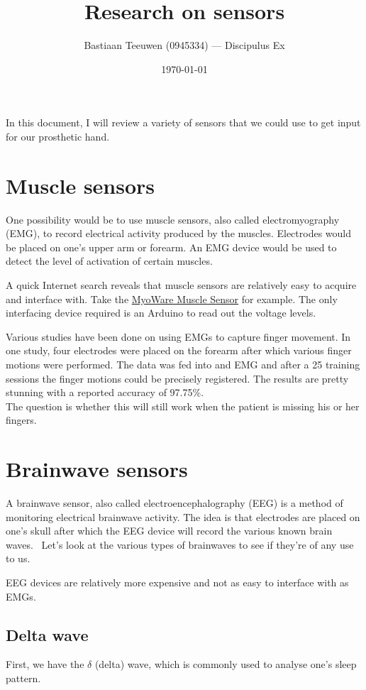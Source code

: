 \documentclass[11pt,a4paper]{article}
\title{Research on sensors}
\author{Bastiaan Teeuwen (0945334) --- Discipulus Ex}
\date{\today}
\begin{document}
\maketitle

In this document, I will review a variety of sensors that we could use to get
input for our prosthetic hand.

\section{Muscle sensors}
One possibility would be to use muscle sensors, also called electromyography
(EMG), to record electrical activity produced by the muscles. Electrodes would
be placed on one's upper arm or forearm. An EMG device would be used to detect
the level of activation of certain muscles.~\cite{emg}

A quick Internet search reveals that muscle sensors are relatively easy to
acquire and interface with. Take the
\href{https://www.sparkfun.com/products/13723}{MyoWare Muscle Sensor} for
example. The only interfacing device required is an Arduino to read out the
voltage levels.

Various studies have been done on using EMGs to capture finger movement. In one
study, four electrodes were placed on the forearm after which various finger
motions were performed. The data was fed into and EMG and after a 25 training
sessions the finger motions could be precisely registered. The results are
pretty stunning with a reported accuracy of 97.75\%.~\cite{decoding}\\
The question is whether this will still work when the patient is missing his or
her fingers.

\section{Brainwave sensors}
A brainwave sensor, also called electroencephalography (EEG) is a method of
monitoring electrical brainwave activity. The idea is that electrodes are placed
on one's skull after which the EEG device will record the various known brain
waves.~\cite{eeg} Let's look at the various types of brainwaves to see if
they're of any use to us.

EEG devices are relatively more expensive and not as easy to interface with as
EMGs.~\cite{eegbuy}

\subsection{Delta wave}
First, we have the $\delta$ (delta) wave, which is commonly used to analyse
one's sleep pattern.~\cite{delta}
\end{document}
